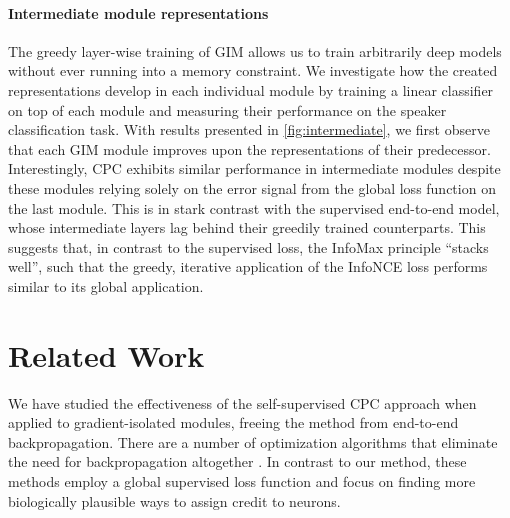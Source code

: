 \documentclass{article}
\begin{document}
\paragraph{Intermediate module representations}
The greedy layer-wise training of GIM allows us to train arbitrarily deep models without ever running into a memory constraint. We investigate how the created representations develop in each individual module by training a linear classifier on top of each module and measuring their performance on the speaker classification task. With results presented in \cref{fig:intermediate}, we first observe that each GIM module improves upon the representations of their predecessor. Interestingly, CPC exhibits similar performance in intermediate modules despite these modules relying solely on the error signal from the global loss function on the last module. This is in stark contrast with the supervised end-to-end model, whose intermediate layers lag behind their greedily trained counterparts. This suggests that, in contrast to the supervised loss, the InfoMax principle ``stacks well'', such that the greedy, iterative application of the InfoNCE loss performs similar to its global application.



















%
 

\section{Related Work}\label{sec:literature}
We have studied the effectiveness of the self-supervised CPC approach \citep{oord2018representation,Henaff2019-nb} when applied to gradient-isolated modules, freeing the method from end-to-end backpropagation. 
There are a number of optimization algorithms that eliminate the need for backpropagation altogether \citep{scellier2017equilibrium,lillicrap2016random,kohan2018error,balduzzi2015kickback,lee2015difference, ororbia2018conducting,xiao2018biologically}. In contrast to our method, these methods employ a global supervised loss function and focus on finding more biologically plausible ways to assign credit to neurons.
\end{document}
